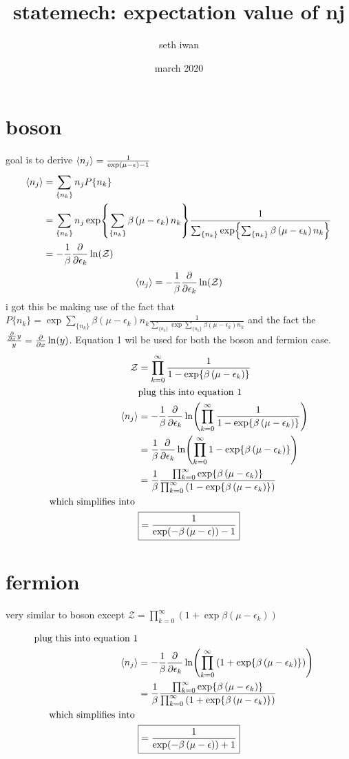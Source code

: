 \documentclass{article}
\title{statemech: expectation value of nj}
\author{seth iwan }
\date{march 2020}
\newcommand{\nm}{\begin{equation}}
\newcommand{\enm}{\end{equation}}
\newcommand{\lp}{\left(}
\newcommand{\rp}{\right)}
\begin{document}
\maketitle
\section{boson}
goal is to derive $\expval{ n_j}  = \frac{1}{\exp(\mu-\epsilon)-1}$
\begin{align*}
\expval{n_j}&=\sum_{\{n_k\}}n_j P\{n_k\} \\
&= \sum_{\{n_k\}}n_j \exp{\sum_{\{n_k\}} \beta\lp\mu-\epsilon_k\rp n_k}\frac{1}{\sum_{\{n_k\}}\exp{\sum_{\{n_k\}} \beta\lp\mu-\epsilon_k\rp n_k}} \\
&=-\frac{1}{\beta}\pdv{\epsilon_k} \ln(\mathcal{Z})
\end{align*}
\nm
\expval{n_j}=-\frac{1}{\beta}\pdv{\epsilon_k} \ln(\mathcal{Z})
\enm
i got this be making use of the fact that $P\{n_k\}=\exp{\sum_{\{n_k\}} \beta\lp\mu-\epsilon_k\rp n_k}\frac{1}{\sum_{\{n_k\}}\exp{\sum_{\{n_k\}} \beta\lp\mu-\epsilon_k\rp n_k}}$ and the fact the $\frac{\pdv{x}y}{y}=\pdv{x}\ln(y)$.  Equation 1 wil be used for both the boson and fermion case. 
\begin{align*}
\mathcal{Z}&=\prod_{k=0}^{\infty}\frac{1}{1-\exp{\beta\lp\mu-\epsilon_k\rp}} \\
&\text{plug this into equation 1} \\
\expval{n_j}&=-\frac{1}{\beta}\pdv{\epsilon_k} \ln(\prod_{k=0}^{\infty}\frac{1}{1-\exp{\beta\lp\mu-\epsilon_k\rp}}) \\
                 &=\frac{1}{\beta}\pdv{\epsilon_k} \ln(\prod_{k=0}^{\infty}1-\exp{\beta\lp\mu-\epsilon_k\rp}) \\
                 &=\frac{1}{\beta}\frac{\prod_{k=0}^{\infty}\exp{\beta\lp\mu-\epsilon_k\rp}}{\prod_{k=0}^{\infty}\lp1-\exp{\beta\lp\mu-\epsilon_k\rp}\rp} \\
                 \text{which simplifies into } \\
                 & \boxed {=\frac{1}{\exp(-\beta\lp \mu-\epsilon\rp)-1}}
\end{align*}

\section{fermion}
very similar to boson except $\mathcal{Z}=\prod_{k=0}^{\infty}\lp1+\exp{\beta\lp\mu-\epsilon_k\rp}\rp$

\begin{align*}
\text{plug this into equation 1} \\
\expval{n_j}&=-\frac{1}{\beta}\pdv{\epsilon_k} \ln(\prod_{k=0}^{\infty}\lp1+\exp{\beta\lp\mu-\epsilon_k\rp}\rp) \\
                 &=\frac{1}{\beta}\frac{\prod_{k=0}^{\infty}\exp{\beta\lp\mu-\epsilon_k\rp}}{\prod_{k=0}^{\infty}\lp1+\exp{\beta\lp\mu-\epsilon_k\rp}\rp} \\
                 \text{which simplifies into } \\
                 & \boxed {=\frac{1}{\exp(-\beta\lp \mu-\epsilon\rp)+1}}
\end{align*}
\end{document}
